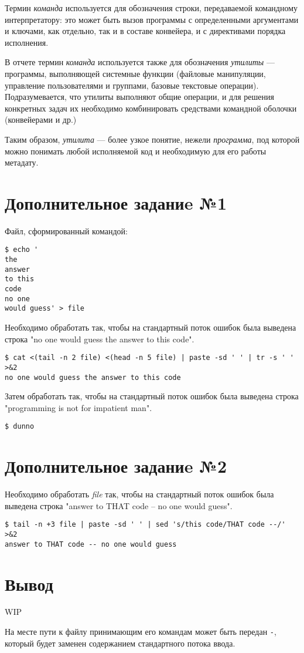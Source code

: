 \documentclass[listings]{labreport}
\begin{document}
Термин \textit{команда} используется для обозначения строки, передаваемой командному интерпретатору: это может быть вызов программы с
определенными аргументами и ключами, как отдельно, так и в составе конвейера, и с директивами порядка исполнения.

В отчете термин \textit{команда} используется также для обозначения \textit{утилиты} — программы, выполняющей системные функции
(файловые манипуляции, управление пользователями и группами, базовые текстовые операции). Подразумевается, что утилиты выполняют
общие операции, и для решения конкретных задач их необходимо комбинировать средствами командной оболочки (конвейерами и др.)

Таким образом, \textit{утилита} — более узкое понятие, нежели \textit{программа}, под которой можно понимать любой исполняемой код
и необходимую для его работы метадату.

\section*{Дополнительное заданиe №1}

Файл, сформированный командой:
\begin{verbatim}
$ echo '
the
answer
to this
code
no one
would guess' > file
\end{verbatim}

Необходимо обработать так, чтобы на стандартный поток ошибок была выведена строка "no one would guess the answer to this code".

\begin{verbatim}
$ cat <(tail -n 2 file) <(head -n 5 file) | paste -sd ' ' | tr -s ' ' >&2
no one would guess the answer to this code
\end{verbatim}

Затем обработать так, чтобы на стандартный поток ошибок была выведена строка "programming is not for impatient man".

\begin{verbatim}
$ dunno
\end{verbatim}

\section*{Дополнительное заданиe №2}

Необходимо обработать \textit{file} так, чтобы на стандартный поток ошибок была выведена строка "answer to THAT code -- no one would guess".

\begin{verbatim}
$ tail -n +3 file | paste -sd ' ' | sed 's/this code/THAT code --/' >&2
answer to THAT code -- no one would guess
\end{verbatim}

\section*{Вывод}

WIP

На месте пути к файлу принимающим его командам может быть передан \texttt{-}, который будет заменен
содержанием стандартного потока ввода.
\end{document}
